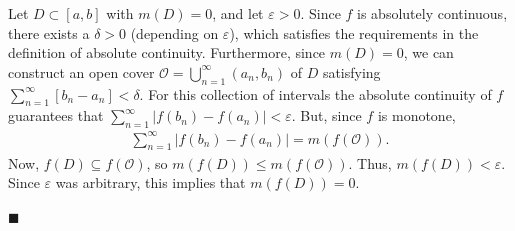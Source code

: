 \documentclass[12pt]{article}
\begin{document}
\noindent Let $D\subset[a,b]$ with $m(D) = 0$, and let $\varepsilon > 0$. Since $f$ is absolutely continuous, there exists a $\delta > 0$ (depending on $\varepsilon$), which satisfies the requirements in the definition of absolute continuity. Furthermore, since $m(D) = 0$, we can construct an open cover $\mathcal{O} = \bigcup\limits_{n=1}^{\infty}(a_n, b_n)$ of $D$ satisfying $\sum\limits_{n=1}^{\infty}\left[b_n - a_n \right] < \delta$. For this collection of intervals the absolute continuity of $f$ guarantees that $\sum\limits_{n=1}^{\infty}\left|f(b_n) - f(a_n)\right|<\varepsilon.$ But, since $f$ is monotone, 
\begin{align}
\sum\limits_{n=1}^{\infty}|f(b_n)-f(a_n)| = m(f(\mathcal{O})).
\end{align}
Now, $f(D) \subseteq f(\mathcal{O})$, so $m(f(D)) \leq m(f(\mathcal{O}))$. Thus, $m(f(D)) < \varepsilon$. Since $\varepsilon$ was arbitrary, this implies that $m(f(D)) = 0.$

\hfill$\blacksquare$
\end{document}
